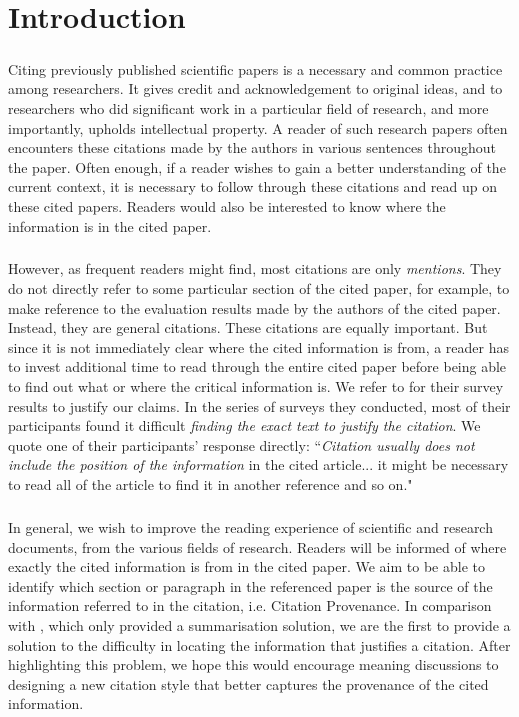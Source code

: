 \chapter{Introduction}
\label{introduction}
\paragraph{}
Citing previously published scientific papers is a necessary and common practice among researchers. It gives credit and acknowledgement to original ideas, and to researchers who did significant work in a particular field of research, and more importantly, upholds intellectual property. A reader of such research papers often encounters these citations made by the authors in various sentences throughout the paper. Often enough, if a reader wishes to gain a better understanding of the current context, it is necessary to follow through these citations and read up on these cited papers. Readers would also be interested to know where the information is in the cited paper.

\paragraph{}
However, as frequent readers might find, most citations are only \textit{mentions}. They do not directly refer to some particular section of the cited paper, for example, to make reference to the evaluation results made by the authors of the cited paper. Instead, they are general citations. These citations are equally important. But since it is not immediately clear where the cited information is from, a reader has to invest additional time to read through the entire cited paper before being able to find out what or where the critical information is. We refer to \cite{citation-sensitive} for their survey results to justify our claims. In the series of surveys they conducted, most of their participants found it difficult \textit{finding the exact text to justify the citation}. We quote one of their participants' response directly: ``\textit{Citation usually does not include the position of the information} in the cited article... it might be necessary to read all of the article to find it in another reference and so on." \cite{citation-sensitive}

\paragraph{}
In general, we wish to improve the reading experience of scientific and research documents, from the various fields of research. Readers will be informed of where exactly the cited information is from in the cited paper. We aim to be able to identify which section or paragraph in the referenced paper is the source of the information referred to in the citation, i.e. Citation Provenance. In comparison with \cite{csibs}, which only provided a summarisation solution, we are the first to provide a solution to the difficulty in locating the information that justifies a citation. After highlighting this problem, we hope this would encourage meaning discussions to designing a new citation style that better captures the provenance of the cited information.
 
